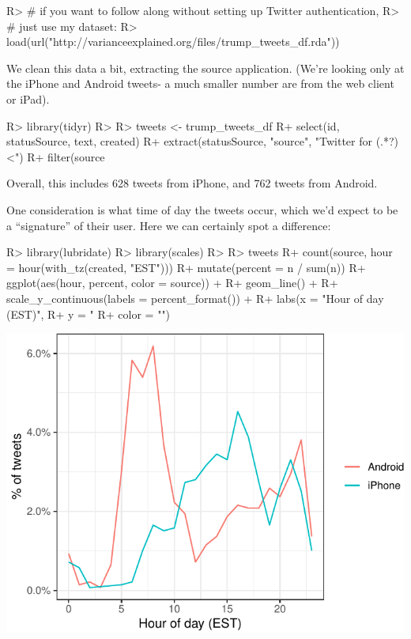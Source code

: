 \documentclass[
]{jss}
\begin{document}
\begin{CodeChunk}

\begin{CodeInput}
R> # if you want to follow along without setting up Twitter authentication,
R> # just use my dataset:
R> load(url("http://varianceexplained.org/files/trump_tweets_df.rda"))
\end{CodeInput}
\end{CodeChunk}

We clean this data a bit, extracting the source application. (We're
looking only at the iPhone and Android tweets- a much smaller number are
from the web client or iPad).

\begin{CodeChunk}

\begin{CodeInput}
R> library(tidyr)
R> 
R> tweets <- trump_tweets_df %
R+   select(id, statusSource, text, created) %
R+   extract(statusSource, "source", "Twitter for (.*?)<") %
R+   filter(source %
\end{CodeInput}
\end{CodeChunk}

Overall, this includes 628 tweets from iPhone, and 762 tweets from
Android.

One consideration is what time of day the tweets occur, which we'd
expect to be a ``signature'' of their user. Here we can certainly spot a
difference:

\begin{CodeChunk}

\begin{CodeInput}
R> library(lubridate)
R> library(scales)
R> 
R> tweets %
R+   count(source, hour = hour(with_tz(created, "EST"))) %
R+   mutate(percent = n / sum(n)) %
R+   ggplot(aes(hour, percent, color = source)) +
R+   geom_line() +
R+   scale_y_continuous(labels = percent_format()) +
R+   labs(x = "Hour of day (EST)",
R+        y = "%
R+        color = "")
\end{CodeInput}


\begin{center}\includegraphics{Live_Demo2_files/figure-latex/unnamed-chunk-2-1} \end{center}

\end{CodeChunk}
\end{document}
